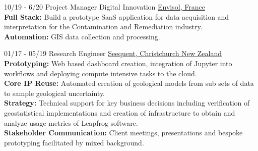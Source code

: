 \documentclass[]{friggeri-cv}
\begin{document}
\begin{entrylist}
 	\entry
	{10/19 - 6/20}
	{Project Manager Digital Innovation}
	{\href{http://envisol.net/}{Envisol, France}}
	{
	\\[-0.5em]
	\textbf{Full Stack: } Build a prototype SaaS application for data acquisition and interpretation for the Contamination and Remediation industry.
	\\[3pt]
	\textbf{Automation: } GIS data collection and processing.
	}
  
 	\entry
    {01/17 - 05/19}
    {Research Engineer}
    {\href{https://www.seequent.com/}{Seequent, Christchurch New Zealand}}
    {
    \\[-0.5em]
   	\textbf{Prototyping: }Web based dashboard creation, integration of Jupyter into workflows and deploying compute intensive tasks to the cloud.
   	\\[3pt]
   	\textbf{Core IP Reuse: }Automated creation of geological models from sub sets of data to sample geological uncertainty.
    \\[3pt]
   	\textbf{Strategy: }Technical support for key business decisions including verification of geostatistical implementations and creation of infrastructure to obtain and analyze usage metrics of Leapfrog software. 
    \\[3pt]
	\textbf{Stakeholder Communication: }Client meetings, presentations and bespoke prototyping facilitated by mixed background.
	}
  

    

\end{entrylist}
\end{document}
